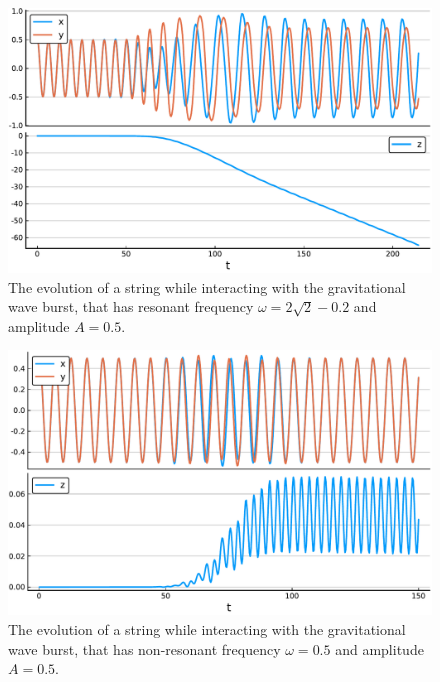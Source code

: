 \begin{figure}[p]
	\centering
	\includegraphics[width=1.0 \textwidth]{pictures/grav_evol_res.pdf}
	\caption{The evolution of a string while interacting with the gravitational wave burst, that has resonant frequency $\omega = 2 \sqrt{2} - 0.2$ and amplitude $A = 0.5$.}
	\label{fig:grav_evol_res}
\end{figure}

\begin{figure}[p]
	\centering
	\includegraphics[width=1.0 \textwidth]{pictures/grav_evol_nonres.pdf}
	\caption{The evolution of a string while interacting with the gravitational wave burst, that has non-resonant frequency $\omega = 0.5$ and amplitude $A = 0.5$.}
	\label{fig:grav_evol_nonres}
\end{figure}



